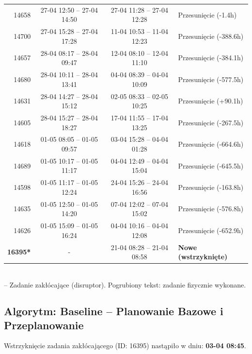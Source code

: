 \begin{table}[htbp]
\begin{tabular}{|r|c|c|l|}
14658 & 27-04 12:50 -- 27-04 14:50 & 27-04 11:28 -- 27-04 12:28 & Przesunięcie (-1.4h) \\ 
14700 & 27-04 15:28 -- 27-04 17:28 & 11-04 10:53 -- 11-04 12:23 & Przesunięcie (-388.6h) \\ 
14657 & 28-04 08:17 -- 28-04 09:47 & 12-04 08:10 -- 12-04 11:10 & Przesunięcie (-384.1h) \\ 
14680 & 28-04 10:11 -- 28-04 13:41 & 04-04 08:39 -- 04-04 10:09 & Przesunięcie (-577.5h) \\ 
14631 & 28-04 14:27 -- 28-04 15:12 & 02-05 08:33 -- 02-05 10:25 & Przesunięcie (+90.1h) \\ 
14605 & 28-04 15:27 -- 28-04 18:27 & 17-04 11:55 -- 17-04 13:25 & Przesunięcie (-267.5h) \\ 
14618 & 01-05 08:05 -- 01-05 09:57 & 03-04 15:28 -- 04-04 01:28 & Przesunięcie (-664.6h) \\ 
14689 & 01-05 10:17 -- 01-05 11:17 & 04-04 12:49 -- 04-04 15:04 & Przesunięcie (-645.5h) \\ 
14598 & 01-05 11:17 -- 01-05 12:24 & 24-04 15:26 -- 24-04 16:56 & Przesunięcie (-163.8h) \\ 
14635 & 01-05 12:50 -- 01-05 14:20 & 07-04 12:02 -- 07-04 15:02 & Przesunięcie (-576.8h) \\ 
14626 & 01-05 15:09 -- 01-05 16:24 & 04-04 10:16 -- 04-04 12:08 & Przesunięcie (-652.9h) \\ 
\hline
\textbf{16395*} & - & 21-04 08:28 -- 21-04 08:58 & \textbf{Nowe (wstrzyknięte)} \\ 
\hline
\end{tabular}
\\ {\footnotesize * -- Zadanie zakłócające (disruptor). Pogrubiony tekst: zadanie fizycznie wykonane.}
\end{table}

\vspace{0.8cm}
\subsection{Algorytm: Baseline -- Planowanie Bazowe i Przeplanowanie}

Wstrzyknięcie zadania zakłócającego (ID: 16395) nastąpiło w dniu: \textbf{03-04 08:45}.

